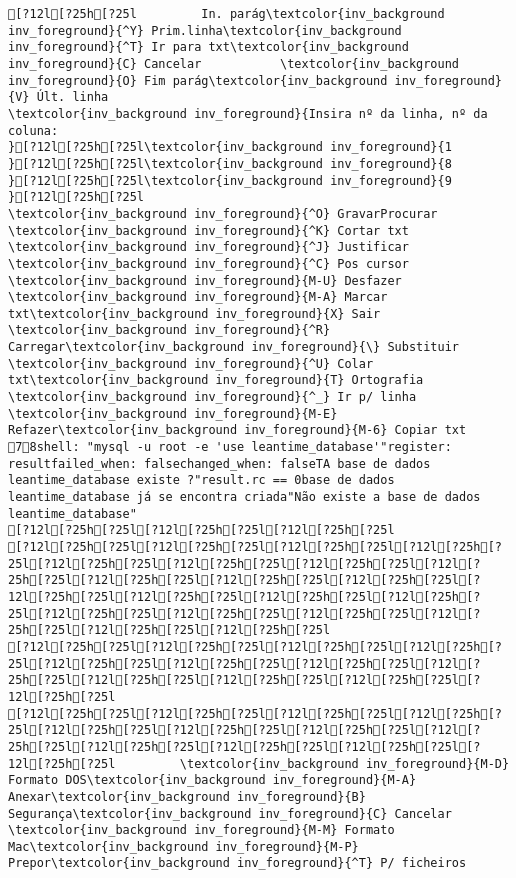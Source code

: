 \documentclass{scrartcl}
\begin{document}
\begin{Verbatim}
[?12l[?25h[?25l         In. parág\textcolor{inv_background inv_foreground}{^Y} Prim.linha\textcolor{inv_background inv_foreground}{^T} Ir para txt\textcolor{inv_background inv_foreground}{C} Cancelar           \textcolor{inv_background inv_foreground}{O} Fim parág\textcolor{inv_background inv_foreground}{V} Últ. linha
\textcolor{inv_background inv_foreground}{Insira nº da linha, nº da coluna:                                                                                                         }[?12l[?25h[?25l\textcolor{inv_background inv_foreground}{1
}[?12l[?25h[?25l\textcolor{inv_background inv_foreground}{8
}[?12l[?25h[?25l\textcolor{inv_background inv_foreground}{9
}[?12l[?25h[?25l
\textcolor{inv_background inv_foreground}{^O} GravarProcurar      \textcolor{inv_background inv_foreground}{^K} Cortar txt    \textcolor{inv_background inv_foreground}{^J} Justificar    \textcolor{inv_background inv_foreground}{^C} Pos cursor    \textcolor{inv_background inv_foreground}{M-U} Desfazer     \textcolor{inv_background inv_foreground}{M-A} Marcar txt\textcolor{inv_background inv_foreground}{X} Sair    \textcolor{inv_background inv_foreground}{^R} Carregar\textcolor{inv_background inv_foreground}{\} Substituir    \textcolor{inv_background inv_foreground}{^U} Colar txt\textcolor{inv_background inv_foreground}{T} Ortografia    \textcolor{inv_background inv_foreground}{^_} Ir p/ linha   \textcolor{inv_background inv_foreground}{M-E} Refazer\textcolor{inv_background inv_foreground}{M-6} Copiar txt
78shell: "mysql -u root -e 'use leantime_database'"register: resultfailed_when: falsechanged_when: falseTA base de dados leantime_database existe ?"result.rc == 0base de dados leantime_database já se encontra criada"Não existe a base de dados leantime_database"
[?12l[?25h[?25l[?12l[?25h[?25l[?12l[?25h[?25l
[?12l[?25h[?25l[?12l[?25h[?25l[?12l[?25h[?25l[?12l[?25h[?25l[?12l[?25h[?25l[?12l[?25h[?25l[?12l[?25h[?25l[?12l[?25h[?25l[?12l[?25h[?25l[?12l[?25h[?25l[?12l[?25h[?25l[?12l[?25h[?25l[?12l[?25h[?25l[?12l[?25h[?25l[?12l[?25h[?25l[?12l[?25h[?25l[?12l[?25h[?25l[?12l[?25h[?25l[?12l[?25h[?25l[?12l[?25h[?25l[?12l[?25h[?25l
[?12l[?25h[?25l[?12l[?25h[?25l[?12l[?25h[?25l[?12l[?25h[?25l[?12l[?25h[?25l[?12l[?25h[?25l[?12l[?25h[?25l[?12l[?25h[?25l[?12l[?25h[?25l[?12l[?25h[?25l[?12l[?25h[?25l[?12l[?25h[?25l
[?12l[?25h[?25l[?12l[?25h[?25l[?12l[?25h[?25l[?12l[?25h[?25l[?12l[?25h[?25l[?12l[?25h[?25l[?12l[?25h[?25l[?12l[?25h[?25l[?12l[?25h[?25l[?12l[?25h[?25l[?12l[?25h[?25l[?12l[?25h[?25l         \textcolor{inv_background inv_foreground}{M-D} Formato DOS\textcolor{inv_background inv_foreground}{M-A} Anexar\textcolor{inv_background inv_foreground}{B} Segurança\textcolor{inv_background inv_foreground}{C} Cancelar           \textcolor{inv_background inv_foreground}{M-M} Formato Mac\textcolor{inv_background inv_foreground}{M-P} Prepor\textcolor{inv_background inv_foreground}{^T} P/ ficheiros

\end{Verbatim}
\end{document}
